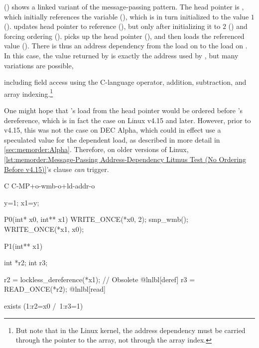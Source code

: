 \begin{fcvref}
()
shows a linked variant of the message-passing pattern.
The head pointer is , which initially
references the  variable  (), which is in turn
initialized to the value $1$ ().
 updates head pointer  to reference  (),
but only after initializing it to $2$ () and forcing ordering
().
 picks up the head pointer  (), and then loads
the referenced value ().
There is thus an address dependency from the load on  to the
load on .
In this case, the value returned by  is exactly the address
used by , but many variations are possible,
\end{fcvref}
including field access using the C-language \co{->} operator,
addition, subtraction, and array indexing.\footnote{
	But note that in the Linux kernel, the address dependency must
	be carried through the pointer to the array, not through the
	array index.}

\begin{fcvref}
One might hope that 's load from the head pointer would be ordered
before 's dereference, which is in fact the case on Linux v4.15
and later.
However, prior to v4.15, this was not the case on DEC Alpha, which could
in effect use a speculated value for the dependent load, as described
in more detail in \cref{sec:memorder:Alpha}.
Therefore, on older versions of Linux,
\cref{lst:memorder:Message-Passing Address-Dependency Litmus Test (No Ordering Before v4.15)}'s
 clause \emph{can} trigger.
\end{fcvref}

\begin{listing}
\begin{fcvlabel}
\begin{VerbatimL}[commandchars=\@\[\]]
C C-MP+o-wmb-o+ld-addr-o

{
y=1;
x1=y;
}

P0(int* x0, int** x1) {
	WRITE_ONCE(*x0, 2);
	smp_wmb();
	WRITE_ONCE(*x1, x0);
}

P1(int** x1) {
	int *r2;
	int r3;

	r2 = lockless_dereference(*x1); // Obsolete @lnlbl[deref]
	r3 = READ_ONCE(*r2);			    @lnlbl[read]
}

exists (1:r2=x0 /\ 1:r3=1)
\end{VerbatimL}
\end{fcvlabel}
\caption{Enforced Ordering of Message-Passing Address-Dependency Litmus Test (Before v4.15)}
\label{lst:memorder:Enforced Ordering of Message-Passing Address-Dependency Litmus Test (Before v4.15)}
\end{listing}

